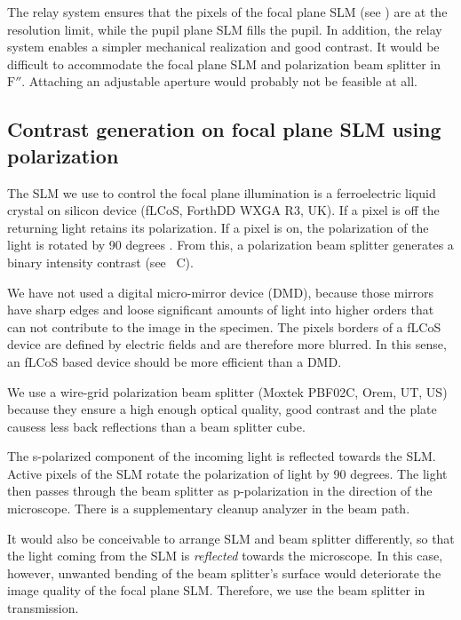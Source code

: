 The relay system ensures that the pixels of the focal plane SLM (see
) are at the resolution limit, while the pupil
plane SLM fills the pupil.  In addition, the relay system enables a
simpler mechanical realization and good contrast. It would be
difficult to accommodate the focal plane SLM and polarization beam
splitter in $\textrm{F}''$. Attaching an adjustable aperture would
probably not be feasible at all.


\subsection{ Contrast generation on focal plane SLM using
  polarization}
The SLM we use to control the focal plane illumination is a   ferroelectric liquid crystal on silicon device
(fLCoS, ForthDD WXGA R3, UK). If a pixel is off the returning light
retains its polarization. If a pixel is on, the polarization of the
light is rotated by 90 degrees \citep{Martinez-Garcia2009}.  From
this, a polarization beam splitter generates a binary intensity
contrast (see ~C).

We have not used a digital micro-mirror device (DMD), because those
mirrors have sharp edges and loose significant amounts of light into
higher orders that can not contribute to the image in the
specimen. The pixels borders of a fLCoS device are defined by electric
fields and are therefore more blurred. In this sense, an fLCoS based
device should be more efficient than a DMD.

We use a wire-grid polarization beam splitter (Moxtek PBF02C,     
Orem, UT, US) because they ensure a high enough optical quality, good
contrast and the plate causess less back reflections than a beam
splitter cube.



The s-polarized component of the incoming light is reflected towards
the SLM. Active pixels of the SLM rotate the polarization of light by
90 degrees. The light then passes through the beam splitter as
p-polarization in the direction of the microscope. There is a
supplementary cleanup analyzer in the beam path.

It would also be conceivable to arrange SLM and beam splitter
differently, so that the light coming from the SLM is \emph{reflected}
towards the microscope. In this case, however, unwanted bending of the
beam splitter's surface would deteriorate the image quality of the
focal plane SLM. Therefore, we use the beam splitter in transmission.


